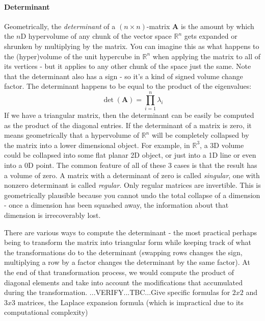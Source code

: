 \paragraph{Determinant}
Geometrically, the \emph{determinant} of a $(n \times n)$-matrix $\mathbf{A}$ is the amount by which the $n$D hypervolume of any chunk of the vector space $\mathbb{R}^n$ gets expanded or shrunken by multiplying by the matrix. You can imagine this as what happens to the (hyper)volume of the unit hypercube in $\mathbb{R}^n$ when applying the matrix to all of its vertices - but it applies to any other chunk of the space just the same. Note that the determinant also has a sign - so it's a kind of signed volume change factor. The determinant happens to be equal to the product of the eigenvalues:
\begin{equation}
 \det(\mathbf{A}) = \prod_{i = 1}^{n} \lambda_i
\end{equation}
If we have a triangular matrix, then the determinant can be easily be computed as the product of the diagonal entries. If the determinant of a matrix is zero, it means geometrically that a hypervolume of $\mathbb{R}^n$ will be completely collapsed by the matrix into a lower dimensional object. For example, in $\mathbb{R}^3$, a 3D volume could be collapsed into some flat planar 2D object, or just into a 1D line or even into a 0D point. The common feature of all of these 3 cases is that the result has a volume of zero. A matrix with a determinant of zero is called \emph{singular}, one with nonzero determinant is called \emph{regular}. Only regular matrices are invertible. This is geometrically plausible because you cannot undo the total collapse of a dimension - once a dimension has been squashed away, the information about that dimension is irrecoverably lost. 

\medskip
There are various ways to compute the determinant - the most practical perhaps being to transform the matrix into triangular form while keeping track of what the transformations do to the determinant (swapping rows changes the sign, multiplying a row by a factor changes the determinant by the same factor). At the end of that transformation process, we would compute the product of diagonal elements and take into account the modifications that accumulated during the transformation. ...VERIFY...TBC...Give specific formulas for $2x2$ and $3x3$ matrices, the Laplace expansion formula (which is impractical due to its computational complexity)


